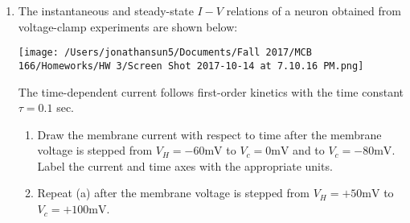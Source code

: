 \documentclass[11pt]{article}
\begin{document}
\begin{enumerate}[label=\arabic*.]
\newpage
\item
The instantaneous and steady-state $I-V$ relations of a neuron obtained from voltage-clamp experiments are shown below:
\begin{center}
\texttt{[image: /Users/jonathansun5/Documents/Fall 2017/MCB 166/Homeworks/HW 3/Screen Shot 2017-10-14 at 7.10.16 PM.png]}
\end{center}
The time-dependent current follows first-order kinetics with the time constant $\tau = 0.1$ sec.
\begin{enumerate}[label=(\alph*)]
\item
Draw the membrane current with respect to time after the membrane voltage is stepped from $V_H = -60 \text{mV}$ to $V_c = 0 \text{mV}$ and to $V_c = -80 \text{mV}$. Label the current and time axes with the appropriate units.






\item
Repeat (a) after the membrane voltage is stepped from $V_H = +50 \text{mV}$ to $V_c = +100 \text{mV}$.












\end{enumerate}




\end{enumerate}
\end{document}
